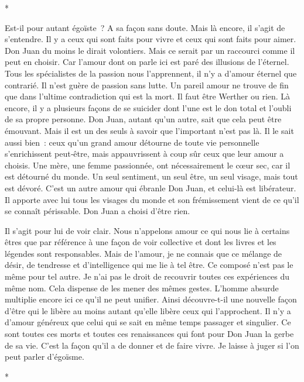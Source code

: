 \documentclass{book}
\begin{document}
\begin{center}
*
\end{center}

Est-il pour autant égoïste ? A sa façon sans doute. Mais là encore, il s'agit de s'entendre. Il y a ceux qui sont faits pour vivre et ceux qui sont faits pour aimer. Don Juan du moins le dirait volontiers. Mais ce serait par un raccourci comme il peut en choisir. Car l'amour dont on parle ici est paré des illusions de l'éternel. Tous les spécialistes de la passion nous l'apprennent, il n'y a d'amour éternel que contrarié. Il n'est guère de passion sans lutte. Un pareil amour ne trouve de fin que dans l'ultime contradiction qui est la mort. Il faut être Werther ou rien. Là encore, il y a plusieurs façons de se suicider dont l'une est le don total et l'oubli de sa propre personne. Don Juan, autant qu'un autre, sait que cela peut être émouvant. Mais il est un des seuls à savoir que l'important n'est pas là. Il le sait aussi bien : ceux qu'un grand amour détourne de toute vie personnelle s'enrichissent peut‑être, mais appauvrissent à coup sûr ceux que leur amour a choisis. Une mère, une femme passionnée, ont nécessairement le cœur sec, car il est détourné du monde. Un seul sentiment, un seul être, un seul visage, mais tout est dévoré. C'est un autre amour qui ébranle Don Juan, et celui-là est libérateur. Il apporte avec lui tous les visages du monde et son frémissement vient de ce qu'il se connaît périssable. Don Juan a choisi d'être rien.

Il s'agit pour lui de voir clair. Nous n'appelons amour ce qui nous lie à certains êtres que par référence à une façon de voir collective et dont les livres et les légendes sont responsables. Mais de l'amour, je ne connais que ce mélange de désir, de tendresse et d'intelligence qui me lie à tel être. Ce composé n'est pas le même pour tel autre. Je n'ai pas le droit de recouvrir toutes ces expériences du même nom. Cela dispense de les mener des mêmes gestes. L'homme absurde multiplie encore ici ce qu'il ne peut unifier. Ainsi découvre-t-il une nouvelle façon d'être qui le libère au moins autant qu'elle libère ceux qui l'approchent. Il n'y a d'amour généreux que celui qui se sait en même temps passager et singulier. Ce sont toutes ces morts et toutes ces renaissances qui font pour Don Juan la gerbe de sa vie. C'est la façon qu'il a de donner et de faire vivre. Je laisse à juger si l'on peut parler d'égoïsme.

\begin{center}
*
\end{center}
\end{document}
